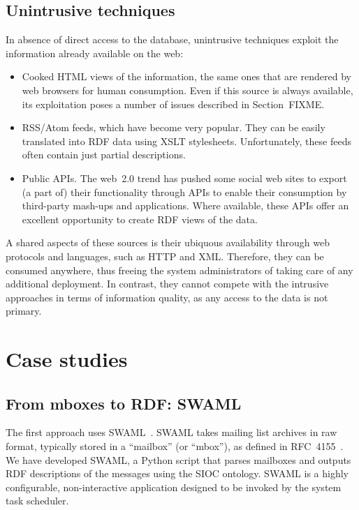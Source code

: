 \documentclass{../templates/www2008-submission}
\begin{document}
\subsection{Unintrusive techniques}

In absence of direct access to the database, unintrusive
techniques exploit the information already available on the web:

\begin{itemize}

\item Cooked HTML views of the information, the same ones that
are rendered by web browsers for human consumption.
Even if this source is always available,
its exploitation poses a number of issues described in Section~FIXME.

\item RSS/Atom feeds, which have become very popular. They can be easily
translated into RDF data using XSLT stylesheets. Unfortunately,
these feeds often contain just partial descriptions.

\item Public APIs. The web~2.0 trend has pushed some social web
sites to export (a part of) their functionality through APIs
to enable their consumption by third-party mash-ups and applications.
Where available, these APIs offer an excellent opportunity to
create RDF views of the data.

\end{itemize}

A shared aspects of these sources is their ubiquous availability through
web protocols and languages, such as HTTP and XML. Therefore, they
can be consumed anywhere, thus freeing the system administrators of
taking care of any additional deployment. In contrast, they cannot compete
with the intrusive approaches in terms of information quality, as
any access to the data is not primary.

\section{Case studies}

\subsection{From mboxes to RDF: SWAML}

The first approach uses SWAML~\cite{SWAML2007}. SWAML takes mailing 
list archives in raw format, typically stored in a ``mailbox'' 
(or ``mbox''), as defined in RFC~4155~\cite{RFC4155}. We have 
developed SWAML, a Python script that parses mailboxes and 
outputs RDF descriptions of the messages using the SIOC ontology.
SWAML is a highly configurable, non-interactive application designed 
to be invoked by the system task scheduler.
\end{document}
